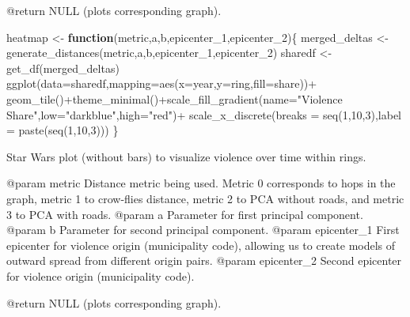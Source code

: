 \documentclass[
]{article}
\newenvironment{Shaded}{\begin{snugshade}}{\end{snugshade}}
\newcommand{\AttributeTok}[1]{\textcolor[rgb]{0.77,0.63,0.00}{#1}}
\newcommand{\ControlFlowTok}[1]{\textcolor[rgb]{0.13,0.29,0.53}{\textbf{#1}}}
\newcommand{\DecValTok}[1]{\textcolor[rgb]{0.00,0.00,0.81}{#1}}
\newcommand{\FunctionTok}[1]{\textcolor[rgb]{0.00,0.00,0.00}{#1}}
\newcommand{\NormalTok}[1]{#1}
\newcommand{\OtherTok}[1]{\textcolor[rgb]{0.56,0.35,0.01}{#1}}
\newcommand{\SpecialCharTok}[1]{\textcolor[rgb]{0.00,0.00,0.00}{#1}}
\newcommand{\StringTok}[1]{\textcolor[rgb]{0.31,0.60,0.02}{#1}}
\begin{document}
@return NULL (plots corresponding graph).

\begin{Shaded}
\begin{Highlighting}[]
\NormalTok{heatmap }\OtherTok{\textless{}{-}} \ControlFlowTok{function}\NormalTok{(metric,a,b,epicenter\_1,epicenter\_2)\{}
\NormalTok{merged\_deltas }\OtherTok{\textless{}{-}} \FunctionTok{generate\_distances}\NormalTok{(metric,a,b,epicenter\_1,epicenter\_2)}
\NormalTok{sharedf }\OtherTok{\textless{}{-}} \FunctionTok{get\_df}\NormalTok{(merged\_deltas)}
\FunctionTok{ggplot}\NormalTok{(}\AttributeTok{data=}\NormalTok{sharedf,}\AttributeTok{mapping=}\FunctionTok{aes}\NormalTok{(}\AttributeTok{x=}\NormalTok{year,}\AttributeTok{y=}\NormalTok{ring,}\AttributeTok{fill=}\NormalTok{share))}\SpecialCharTok{+}
  \FunctionTok{geom\_tile}\NormalTok{()}\SpecialCharTok{+}\FunctionTok{theme\_minimal}\NormalTok{()}\SpecialCharTok{+}\FunctionTok{scale\_fill\_gradient}\NormalTok{(}\AttributeTok{name=}\StringTok{"Violence Share"}\NormalTok{,}\AttributeTok{low=}\StringTok{"darkblue"}\NormalTok{,}\AttributeTok{high=}\StringTok{"red"}\NormalTok{)}\SpecialCharTok{+}
  \FunctionTok{scale\_x\_discrete}\NormalTok{(}\AttributeTok{breaks =} \FunctionTok{seq}\NormalTok{(}\DecValTok{1}\NormalTok{,}\DecValTok{10}\NormalTok{,}\DecValTok{3}\NormalTok{),}\AttributeTok{label =} \FunctionTok{paste}\NormalTok{(}\FunctionTok{seq}\NormalTok{(}\DecValTok{1}\NormalTok{,}\DecValTok{10}\NormalTok{,}\DecValTok{3}\NormalTok{)))}
\NormalTok{\}}
\end{Highlighting}
\end{Shaded}

Star Wars plot (without bars) to visualize violence over time within
rings.

@param metric Distance metric being used. Metric 0 corresponds to hops
in the graph, metric 1 to crow-flies distance, metric 2 to PCA without
roads, and metric 3 to PCA with roads. @param a Parameter for first
principal component. @param b Parameter for second principal component.
@param epicenter\_1 First epicenter for violence origin (municipality
code), allowing us to create models of outward spread from different
origin pairs. @param epicenter\_2 Second epicenter for violence origin
(municipality code).

@return NULL (plots corresponding graph).
\end{document}
